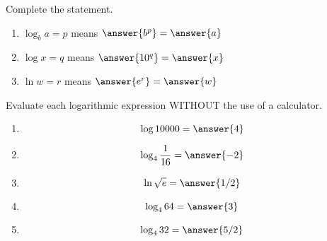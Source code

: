 \documentclass{ximera}
\begin{document}
\begin{problem}\label{prob:160hom7prob8}
Complete the statement.
 \begin{enumerate}
     \item 
 $\log_b a=p$ means $\answer{b^p}=\answer{a}$
 \item
 $\log x=q$ means $\answer{10^q}=\answer{x}$
 \item
 $\ln w=r$ means $\answer{e^r}=\answer{w}$
 \end{enumerate}
 \end{problem}
 
 \begin{problem}\label{prob:160hom7prob9}
 Evaluate each logarithmic expression WITHOUT the use of a calculator.
 \begin{enumerate}
     \item $$\log 10000=\answer{4}$$
     \item $$\log_4\frac{1}{16}=\answer{-2}$$
     \item $$\ln\sqrt{e}=\answer{1/2}$$
     \item $$\log_4 64=\answer{3}$$
     \item $$\log_4 32=\answer{5/2}$$
 \end{enumerate}
 \end{problem}
 
 

 
\end{document}

